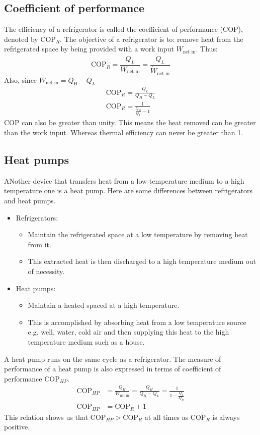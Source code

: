 \subsection{Coefficient of performance}
The efficiency of a refrigerator is called the coefficient of performance (COP), denoted by \(\textrm{COP}_R\). The objective of a refrigerator is to: remove heat from the refrigerated space by being provided with a work input \(W_{\textrm{net in}}\). Thus:
\begin{equation}
  \textrm{COP}_R = \frac{Q_L}{W_{\textrm{net in}}} = \frac{\dot{Q}_L}{\dot{W}_{\textrm{net in}}}
\end{equation}
Also, since \(W_{\textrm{net in}} = Q_{\textrm{H}} - Q_L\)
\begin{align}
  \textrm{COP}_R = \frac{Q_L}{Q_H-Q_L} \\
  \textrm{COP}_R = \frac{1}{\frac{Q_H}{Q_L} - 1}
\end{align}
COP can also be greater than unity. This means the heat removed can be greater than the work input. Whereas thermal efficiency can never be greater than 1.
\subsection{Heat pumps}
ANother device that transfers heat from a low temperature medium to a high temperature one is a heat pump.
Here are some differences between refrigerators and heat pumps.
\begin{itemize}[noitemsep]
  \item Refrigerators:
        \begin{itemize}
          \item Maintain the refrigerated space at a low temperature by removing heat from it.
          \item This extracted heat is then discharged to a high temperature medium out of necessity.
        \end{itemize}
  \item Heat pumps:
        \begin{itemize}
          \item Maintain a heated spaced at a high temperature.
          \item This is accomplished by absorbing heat from a low temperature source e.g. well, water, cold air and then supplying this heat to the high temperature medium such as a house.
        \end{itemize}
\end{itemize}
A heat pump runs on the same cycle as a refrigerator. The measure of performance of a heat pump is also expressed in terms of coefficient of performance \(\textrm{COP}_{HP}\).
\begin{align}
  \textrm{COP}_{HP} & = \frac{Q_H}{W_{\textrm{net in}}} = \frac{Q_H}{Q_H - Q_L} = \frac{1}{1 - \frac{Q_L}{Q_H}} \\
  \textrm{COP}_{HP} & = \textrm{COP}_R + 1
\end{align}
This relation shows us that $\textrm{COP}_{HP} > \textrm{COP}_R$ at all times as $\textrm{COP}_R$ is always positive.
